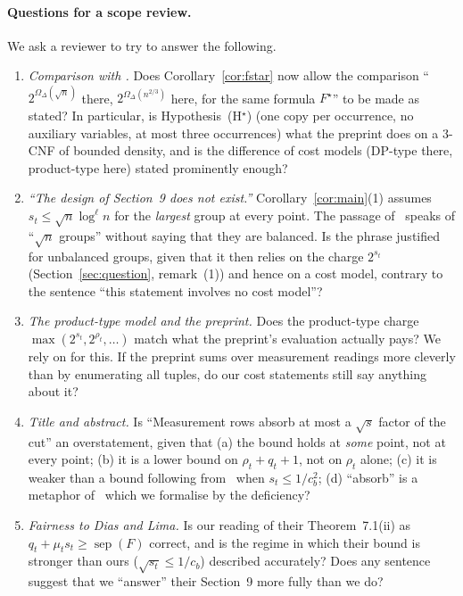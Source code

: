 \documentclass[11pt,a4paper]{article}
\theoremstyle{definition}
\theoremstyle{remark}
\newcommand{\sep}{\operatorname{sep}}
\begin{document}
\paragraph{Questions for a scope review.} We ask a reviewer to try to answer the following.
\begin{enumerate}
\item \emph{Comparison with \cite[Theorem~8.3]{DL}.} Does Corollary~\ref{cor:fstar} now
 allow the comparison ``$2^{\Omega_\Delta(\sqrt n)}$ there, $2^{\Omega_\Delta(n^{2/3})}$
 here, for the same formula $F^\star$'' to be made as stated? In particular, is
 Hypothesis~(H$^\star$) (one copy per occurrence, no auxiliary variables, at most three
 occurrences) what the preprint does on a 3-CNF of bounded density, and is the difference
 of cost models (DP-type there, product-type here) stated prominently enough?
\item \emph{``The design of Section~9 does not exist.''} Corollary~\ref{cor:main}(1) assumes
 $s_t\le\sqrt n\log^\ell n$ for the \emph{largest} group at every point. The passage
 of~\cite{DL} speaks of ``$\sqrt n$ groups'' without saying that they are balanced. Is the
 phrase justified for unbalanced groups, given that it then relies on the charge $2^{s_t}$
 (Section~\ref{sec:question}, remark~(1)) and hence on a cost model, contrary to the
 sentence ``this statement involves no cost model''?
\item \emph{The product-type model and the preprint.} Does the product-type charge
 $\max(2^{s_t},2^{\rho_t},\dots)$ match what the preprint's evaluation actually pays? We
 rely on \cite[Section~5.2]{DL} for this. If the preprint sums over measurement readings
 more cleverly than by enumerating all tuples, do our cost statements still say anything
 about it?
\item \emph{Title and abstract.} Is ``Measurement rows absorb at most a $\sqrt s$ factor of
 the cut'' an overstatement, given that (a) the bound holds at \emph{some} point, not at
 every point; (b) it is a lower bound on $\rho_t+q_t+1$, not on $\rho_t$ alone; (c) it is
 weaker than a bound following from~\cite{DL} when $s_t\le1/c_b^2$; (d) ``absorb'' is a
 metaphor of~\cite{DL} which we formalise by the deficiency?
\item \emph{Fairness to Dias and Lima.} Is our reading of their Theorem~7.1(ii) as
 $q_t+\mu_ts_t\ge\sep(F)$ correct, and is the regime in which their bound is stronger than
 ours ($\sqrt{s_t}\le1/c_b$) described accurately? Does any sentence suggest that we
 ``answer'' their Section~9 more fully than we do?

\end{enumerate}
\end{document}
